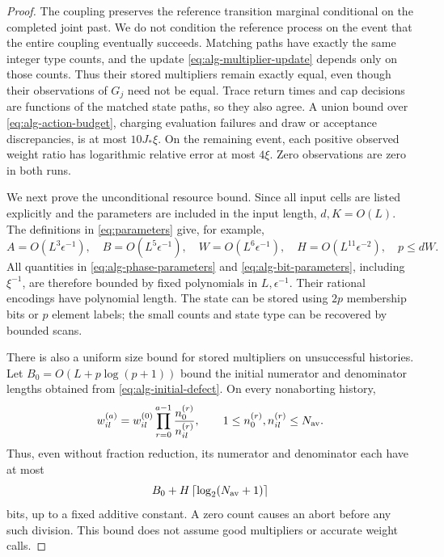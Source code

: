 \begin{proof}
The coupling preserves the reference transition marginal
conditional on the completed joint past.  We do not condition the
reference process on the event that the entire coupling eventually
succeeds.  Matching paths have exactly the same integer type counts,
and the update \eqref{eq:alg-multiplier-update} depends only on
those counts.  Thus their stored multipliers remain exactly equal,
even though their observations of \(G_j\) need not be equal.
Trace return times and cap decisions are functions of the matched
state paths, so they also agree.  A union bound over
\eqref{eq:alg-action-budget}, charging evaluation failures and
draw or acceptance discrepancies, is at most \(10J_*\xi\).
On the remaining event, each positive observed weight ratio has
logarithmic relative error at most \(4\xi\).  Zero observations
are zero in both runs.

We next prove the unconditional resource bound.  Since all input
cells are listed explicitly and the parameters are included in
the input length, \(d,K=O(L)\).  The definitions in
\eqref{eq:parameters} give, for example,
\[
 A=O(L^3\epsilon^{-1}),\quad
 B=O(L^5\epsilon^{-1}),\quad
 W=O(L^6\epsilon^{-1}),\quad
 H=O(L^{11}\epsilon^{-2}),\quad
 p\leq dW.
\]
All quantities in \eqref{eq:alg-phase-parameters} and
\eqref{eq:alg-bit-parameters}, including \(\xi^{-1}\), are
therefore bounded by fixed polynomials in \(L,\epsilon^{-1}\).
Their rational encodings have polynomial length.  The state can be
stored using \(2p\) membership bits or \(p\) element labels;
the small counts and state type can be recovered by bounded scans.

There is also a uniform size bound for stored multipliers on
unsuccessful histories.  Let \(B_0=O(L+p\log(p+1))\) bound the
initial numerator and denominator lengths obtained from
\eqref{eq:alg-initial-defect}.  On every nonaborting history,
\[
 w_{il}^{(a)}
 =w_{il}^{(0)}
   \prod_{r=0}^{a-1}\frac{n_0^{(r)}}{n_{il}^{(r)}},
 \qquad
 1\leq n_0^{(r)},n_{il}^{(r)}\leq N_{\rm av}.
\]
Thus, even without fraction reduction, its numerator and denominator
each have at most
\begin{equation}
 B_0+H\left\lceil\log_2(N_{\rm av}+1)\right\rceil
 \label{eq:alg-multiplier-length}
\end{equation}
bits, up to a fixed additive constant.  A zero count causes an
abort before any such division.  This bound does not assume good
multipliers or accurate weight calls.


\end{proof}
